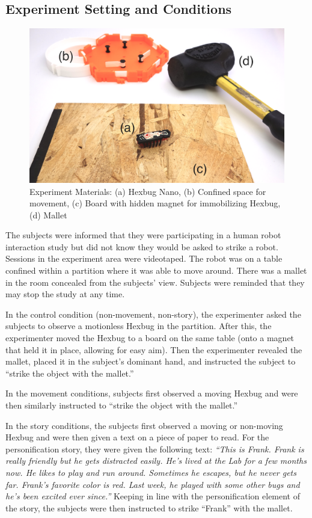 \subsection{Experiment Setting and Conditions}

   \begin{figure}[thpb]
      \centering
      \includegraphics[width=4.6in]{figures/hexbug/setup_small.png}
      \caption{Experiment Materials: (a) Hexbug Nano, (b) Confined space for movement, (c) Board with hidden magnet for immobilizing Hexbug, (d) Mallet}
      \label{experiment_setup}
   \end{figure}

The subjects were informed that they were participating in a human robot interaction study but did not know they would be asked to strike a robot. Sessions in the experiment area were videotaped. The robot was on a table confined within a partition where it was able to move around. There was a mallet in the room concealed from the subjects' view. Subjects were reminded that they may stop the study at any time.
 
In the control condition (non-movement, non-story), the experimenter asked the subjects to observe a motionless Hexbug in the partition. After this, the experimenter moved the Hexbug to a board on the same table (onto a magnet that held it in place, allowing for easy aim). Then the experimenter revealed the mallet, placed it in the subject's dominant hand, and instructed the subject to ``strike the object with the mallet.'' 

In the movement conditions, subjects first observed a moving Hexbug and were then similarly instructed to ``strike the object with the mallet.''
 
In the story conditions, the subjects first observed a moving or non-moving Hexbug and were then given a text on a piece of paper to read. For the personification story, they were given the following text: \emph{``This is Frank. Frank is really friendly but he gets distracted easily. He's lived at the Lab for a few months now. He likes to play and run around. Sometimes he escapes, but he never gets far. Frank's favorite color is red. Last week, he played with some other bugs and he's been excited ever since.''} Keeping in line with the personification element of the story, the subjects were then instructed to strike ``Frank'' with the mallet.
 
